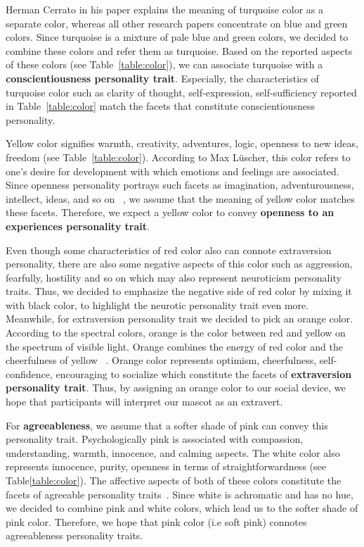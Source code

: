 Herman Cerrato in his paper explains the meaning of turquoise color as a separate color, whereas
all other research papers concentrate on blue and green colors.
Since turquoise is a mixture of pale blue and green colors, we decided to combine
these colors and refer them as turquoise.
Based on the reported aspects of these colors (see Table~\ref{table:color}),
we can associate turquoise with a \textbf{conscientiousness personality trait}.
Especially, the characteristics of turquoise color such as clarity of thought,
self-expression, self-sufficiency reported in Table~\ref{table:color} match the
facets that constitute conscientiousness personality.

Yellow color signifies warmth, creativity, adventures, logic, openness to new
ideas, freedom (see Table~\ref{table:color}).
According to Max Lüscher, this color refers to one’s desire for development
with which emotions and feelings are associated.
Since openness personality portrays such facets as imagination, adventurousness, intellect, ideas,
and so on ~\cite{costa1988catalog}, we assume that the meaning of yellow color matches these facets.
Therefore, we expect a yellow color to convey \textbf{openness to an experiences personality trait}.

Even though some characteristics of red color also can connote extraversion personality,
there are also some negative aspects of this color such as aggression, fearfully,
hostility and so on which may also represent neuroticism personality traits.
Thus, we decided to emphasize the negative side of red color by mixing it with black color,
to highlight the neurotic personality trait even more.
Meanwhile, for extraversion personality trait we decided to pick an orange color.
According to the spectral colors, orange is the color between red and yellow on the spectrum of visible light.
Orange combines the energy of red color and the cheerfulness of yellow ~\cite{cerrato2012meaning}.
Orange color represents optimism, cheerfulness, self-confidence, encouraging
to socialize which constitute the facets of \textbf{extraversion personality trait}.
Thus, by assigning an orange color to our social device, we hope that
participants will interpret our mascot as an extravert.

For \textbf{agreeableness}, we assume that a softer shade of pink can convey this personality trait.
Psychologically pink is associated with compassion, understanding, warmth, innocence, and calming aspects.
The white color also represents innocence, purity, openness in terms of straightforwardness (see Table\ref{table:color}).
The affective aspects of both of these colors constitute the facets of
agreeable personality traits~\cite{costa1988catalog}.
Since white is achromatic and has no hue, we decided to combine
pink and white colors, which lead us to the softer shade of pink color.
Therefore, we hope that pink color (i.e soft pink) connotes agreeableness personality traits.

